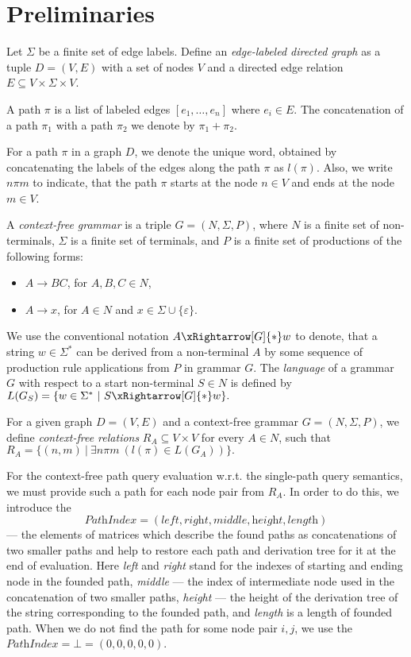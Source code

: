 \section{Preliminaries}
\label{section_preliminaries}

Let $\Sigma$ be a finite set of edge labels. Define an \emph{edge-labeled directed graph} as a tuple \mbox{$D = (V, E)$} with a set of nodes $V$ and a directed edge relation \mbox{$E \subseteq V \times \Sigma \times V$}.

A path $\pi$ is a list of labeled edges $[e_1,\ldots,e_n]$ where $e_i \in E$. The concatenation of a path $\pi_1$ with a path $\pi_2$ we denote by $\pi_1 + \pi_2$.

For a path $\pi$ in a graph $D$, we denote the unique word, obtained by concatenating the labels of the edges along the path $\pi$ as \mbox{$l(\pi)$}. Also, we write \mbox{$n \pi m$} to indicate, that the path $\pi$ starts at the node \mbox{$n \in V$} and ends at the node \mbox{$m \in V$}.

A \emph{context-free grammar} is a triple \mbox{$G = (N, \Sigma, P)$}, where $N$ is a finite set of non-terminals, $\Sigma$ is a finite set of terminals, and $P$ is a finite set of productions of the following forms:

\begin{itemize}
    \item $A \rightarrow B C$, for $A,B,C \in N$,
    \item $A \rightarrow x$, for $A \in N$ and $x \in \Sigma \cup \{\varepsilon\}$.   
\end{itemize}

We use the conventional notation \mbox{$A \xRightarrow[G]{*} w$} to denote, that a string \mbox{$w \in \Sigma^*$} can be derived from a non-terminal $A$ by some sequence of production rule applications from $P$ in grammar $G$. The \emph{language} of a grammar $G$ with respect to a start non-terminal \mbox{$S \in N$} is defined by $L(G_S) = \{w \in \Sigma^*~|~S \xRightarrow[G]{*} w\}.$

For a given graph \mbox{$D = (V, E)$} and a context-free grammar $G = (N, \Sigma, P)$, we define \emph{context-free relations} \mbox{$R_A \subseteq V \times V$} for every \mbox{$A \in N$}, such that $R_A = \{(n,m)~|~\exists n \pi m~(l(\pi) \in L(G_A))\}.$

For the context-free path query evaluation w.r.t. the single-path query semantics, we must provide such a path for each node pair from $R_A$. In order to do this, we introduce the 
$$\textit{PathIndex} = (\textit{left},\textit{right},\textit{middle},\textit{height},\textit{length})$$ 
--- the elements of matrices which describe the found paths as concatenations of two smaller paths and help to restore each path and derivation tree for it at the end of evaluation. Here \textit{left} and \textit{right} stand for the indexes of starting and ending node in the founded path, \textit{middle} --- the index of intermediate node used in the concatenation of two smaller paths, \textit{height} --- the height of the derivation tree of the string corresponding to the founded path, and \textit{length} is a length of founded path. When we do not find the path for some node pair $i,j$, we use the $\textit{PathIndex} = \bot = (0,0,0,0,0)$.

